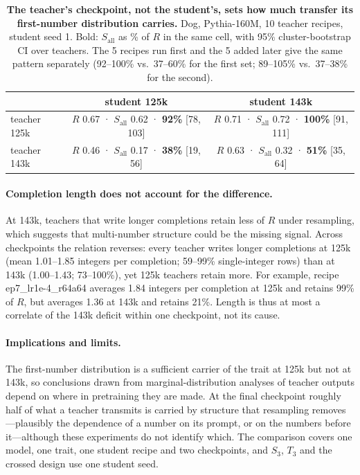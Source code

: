 \begin{table}[t]
\centering
\small
\begin{tabular}{lcc}
\toprule
& student 125k & student 143k \\
\midrule
teacher 125k & $R$ 0.67 · $S_{\mathrm{all}}$ 0.62 · \textbf{92\%} [78, 103] & $R$ 0.71 · $S_{\mathrm{all}}$ 0.72 · \textbf{100\%} [91, 111] \\
teacher 143k & $R$ 0.46 · $S_{\mathrm{all}}$ 0.17 · \textbf{38\%} [19, 56] & $R$ 0.63 · $S_{\mathrm{all}}$ 0.32 · \textbf{51\%} [35, 64] \\
\bottomrule
\end{tabular}
\caption{\textbf{The teacher's checkpoint, not the student's, sets how much transfer its first-number distribution carries.}
Dog, Pythia-160M, 10 teacher recipes, student seed 1. Bold: $S_{\mathrm{all}}$ as \% of $R$ in the same cell, with 95\% cluster-bootstrap CI over teachers. The 5 recipes run first and the 5 added later give the same pattern separately (92--100\% vs.\ 37--60\% for the first set; 89--105\% vs.\ 37--38\% for the second).}
\label{tab:resampling-2x2}
\end{table}

\paragraph{Completion length does not account for the difference.}
At 143k, teachers that write longer completions retain less of $R$ under resampling, which suggests that multi-number structure could be the missing signal.
Across checkpoints the relation reverses: every teacher writes longer completions at 125k (mean 1.01--1.85 integers per completion; 59--99\% single-integer rows) than at 143k (1.00--1.43; 73--100\%), yet 125k teachers retain more.
For example, recipe ep7\_lr1e-4\_r64a64 averages 1.84 integers per completion at 125k and retains 99\% of $R$, but averages 1.36 at 143k and retains 21\%.
Length is thus at most a correlate of the 143k deficit within one checkpoint, not its cause.

\paragraph{Implications and limits.}
The first-number distribution is a sufficient carrier of the trait at 125k but not at 143k, so conclusions drawn from marginal-distribution analyses of teacher outputs depend on where in pretraining they are made.
At the final checkpoint roughly half of what a teacher transmits is carried by structure that resampling removes---plausibly the dependence of a number on its prompt, or on the numbers before it---although these experiments do not identify which.
The comparison covers one model, one trait, one student recipe and two checkpoints, and $S_3$, $T_3$ and the crossed design use one student seed.
